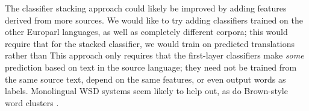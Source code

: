 The classifier stacking approach could likely be improved by adding features
derived from more sources.
We would like to try adding classifiers trained on the other Europarl
languages, as well as completely different corpora; this would require that for
the stacked classifier, we would train on predicted translations rather than
This approach only requires that the first-layer classifiers make \emph{some}
prediction based on text in the source language;
they need not be trained from the same source text, depend on the same
features, or even output words as labels. Monolingual WSD systems seem likely
to help out, as do Brown-style word clusters \cite{brown1992class}.
